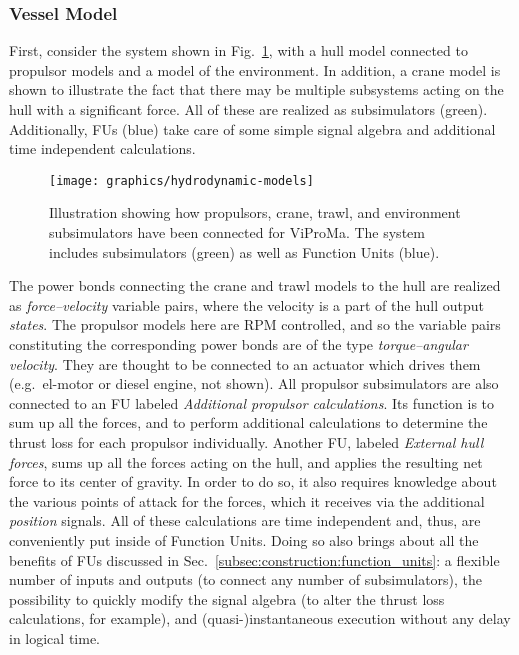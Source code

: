 \documentclass[prb,aps,showpacs,floatfix,twocolumn,10pt]{revtex4-1}
\newcommand{\sub}{subsimulator}
\newlength{\graphicswidth}
\theoremstyle{plain}
\theoremstyle{remark}
\begin{document}
\subsubsection{Vessel Model}
\label{subsec:construction:model_examples:vessel}

First, consider the system shown in Fig.~\ref{fig:hydrodynamic-models}, with a hull model connected to propulsor models and a model of the environment.
In addition, a crane model is shown to illustrate the fact that there may be multiple subsystems acting on the hull with a significant force.
All of these are realized as \sub{}s (green).
Additionally, FUs (blue) take care of some simple signal algebra and additional time independent calculations.

\begin{figure}[h!tb]
  \texttt{[image: graphics/hydrodynamic-models]}
  \caption{%
  	Illustration showing how propulsors, crane, trawl, and environment \sub{}s have been connected for ViProMa.
  	The system includes \sub{}s (green) as well as Function Units (blue).
  }
  \label{fig:hydrodynamic-models}
\end{figure}

The power bonds connecting the crane and trawl models to the hull are realized as \emph{force--velocity} variable pairs, where the velocity is a part of the hull output \emph{states}.
The propulsor models here are RPM controlled, and so the variable pairs constituting the corresponding power bonds are of the type \emph{torque--angular velocity}.
They are thought to be connected to an actuator which drives them (e.g.\ el-motor or diesel engine, not shown).
All propulsor \sub{}s are also connected to an FU labeled \emph{Additional propulsor calculations}.
Its function is to sum up all the forces, and to perform additional calculations to determine the thrust loss for each propulsor individually.
Another FU, labeled \emph{External hull forces}, sums up all the forces acting on the hull, and applies the resulting net force to its center of gravity.
In order to do so, it also requires knowledge about the various points of attack for the forces, which it receives via the additional \emph{position} signals.
All of these calculations are time independent and, thus, are conveniently put inside of Function Units.
Doing so also brings about all the benefits of FUs discussed in Sec.~\ref{subsec:construction:function_units}:
a flexible number of inputs and outputs (to connect any number of \sub{}s), the possibility to quickly modify the signal algebra (to alter the thrust loss calculations, for example), and (quasi-)instantaneous execution without any delay in logical time.
\end{document}

